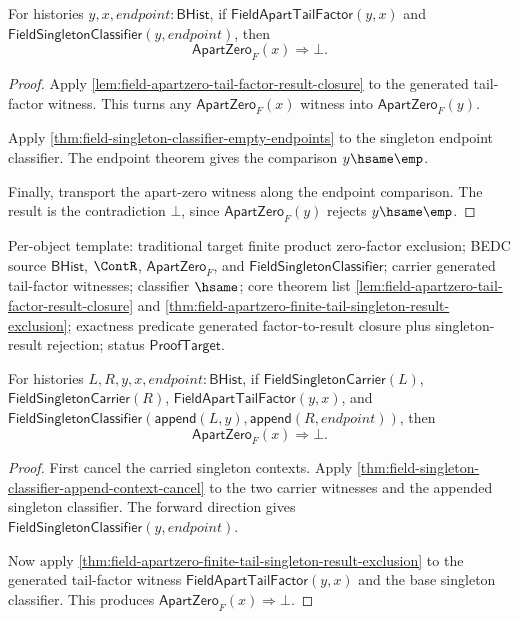 \begin{theorem}
\label{thm:field-apartzero-finite-tail-singleton-result-exclusion}
For histories $y,x,endpoint:\mathsf{BHist}$, if
$\mathsf{FieldApartTailFactor}(y,x)$ and
$\mathsf{FieldSingletonClassifier}(y,endpoint)$, then
$$
\mathsf{ApartZero}_F(x)\Rightarrow\bot.
$$
\end{theorem}
\begin{proof}
Apply
\autoref{lem:field-apartzero-tail-factor-result-closure} to the generated
tail-factor witness. This turns any $\mathsf{ApartZero}_F(x)$ witness into
$\mathsf{ApartZero}_F(y)$.

Apply \autoref{thm:field-singleton-classifier-empty-endpoints} to the
singleton endpoint classifier. The endpoint theorem gives the comparison
$y\hsame\emp$.

Finally, transport the apart-zero witness along the endpoint comparison. The
result is the contradiction $\bot$, since $\mathsf{ApartZero}_F(y)$ rejects
$y\hsame\emp$.
\end{proof}

Per-object template: traditional target finite product zero-factor exclusion;
BEDC source $\mathsf{BHist}$, $\ContR$, $\mathsf{ApartZero}_F$, and
$\mathsf{FieldSingletonClassifier}$; carrier generated tail-factor witnesses;
classifier $\hsame$; core theorem list
\autoref{lem:field-apartzero-tail-factor-result-closure} and
\autoref{thm:field-apartzero-finite-tail-singleton-result-exclusion};
exactness predicate generated factor-to-result closure plus singleton-result
rejection; status $\mathsf{ProofTarget}$.

\begin{theorem}
\label{thm:field-apartzero-finite-tail-contextual-singleton-result-exclusion}
For histories $L,R,y,x,endpoint:\mathsf{BHist}$, if
$\mathsf{FieldSingletonCarrier}(L)$, $\mathsf{FieldSingletonCarrier}(R)$,
$\mathsf{FieldApartTailFactor}(y,x)$, and
$\mathsf{FieldSingletonClassifier}(\mathsf{append}(L,y),\mathsf{append}(R,endpoint))$,
then
$$
\mathsf{ApartZero}_F(x)\Rightarrow\bot.
$$
\end{theorem}
\begin{proof}
First cancel the carried singleton contexts. Apply
\autoref{thm:field-singleton-classifier-append-context-cancel} to the two
carrier witnesses and the appended singleton classifier. The forward direction
gives $\mathsf{FieldSingletonClassifier}(y,endpoint)$.

Now apply
\autoref{thm:field-apartzero-finite-tail-singleton-result-exclusion} to the
generated tail-factor witness
$\mathsf{FieldApartTailFactor}(y,x)$ and the base singleton classifier. This
produces $\mathsf{ApartZero}_F(x)\Rightarrow\bot$.
\end{proof}

